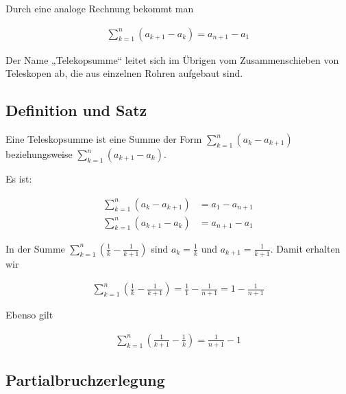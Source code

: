 \documentclass[fontsize=9pt,
               parskip=half-,
               DIV=14,
               listof=chapterentry,
               tocflat]{scrbook}
\begin{document}
Durch eine analoge Rechnung bekommt man

\begin{align*}
\sum _{k=1}^{n}(a_{k+1}-a_{k})=a_{n+1}-a_{1}
\end{align*}

Der Name „Telekopsumme“ leitet sich im Übrigen vom Zusammenschieben von Teleskopen ab, die aus einzelnen Rohren aufgebaut sind.

\subsection{Definition und Satz}

\begin{definition*}[Teleskopsumme]
Eine Teleskopsumme ist eine Summe der Form $\sum _{k=1}^{n}(a_{k}-a_{k+1})$ beziehungsweise $\sum _{k=1}^{n}(a_{k+1}-a_{k})$.

\end{definition*}

\begin{theorem*}
Es ist:

\begin{align*}
\sum _{k=1}^{n}(a_{k}-a_{k+1})&=a_{1}-a_{n+1}\\[0.5em]\sum _{k=1}^{n}(a_{k+1}-a_{k})&=a_{n+1}-a_{1}
\end{align*}

\end{theorem*}

\begin{example*}[Teleskopsumme]
In der Summe $\sum _{k=1}^{n}\left({\tfrac {1}{k}}-{\tfrac {1}{k+1}}\right)$ sind $a_{k}={\tfrac {1}{k}}$ und $a_{k+1}={\tfrac {1}{k+1}}$. Damit erhalten wir

\begin{align*}
\sum _{k=1}^{n}\left({\frac {1}{k}}-{\frac {1}{k+1}}\right)={\frac {1}{1}}-{\frac {1}{n+1}}=1-{\frac {1}{n+1}}
\end{align*}

Ebenso gilt

\begin{align*}
\sum _{k=1}^{n}\left({\frac {1}{k+1}}-{\frac {1}{k}}\right)={\frac {1}{n+1}}-1
\end{align*}

\end{example*}

\subsection{Partialbruchzerlegung}
\end{document}
